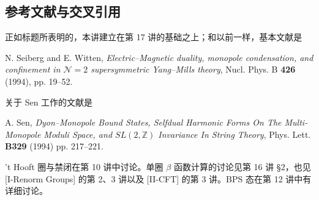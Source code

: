 
\subsection{参考文献与交叉引用}

正如标题所表明的，本讲建立在第 17 讲的基础之上；和以前一样，基本文献是

N. Seiberg and E. Witten, \emph{Electric--Magnetic duality, monopole condensation,
and confinement in $\mathcal{N}=2$ supersymmetric Yang--Mills theory},
Nucl. Phys. B \textbf{426} (1994), pp. 19--52.

关于 Sen 工作的文献是

A. Sen, \emph{Dyon--Monopole Bound States, Selfdual Harmonic Forms On The
Multi-Monopole Moduli Space, and $SL(2,\mathbb{Z})$ Invariance In String Theory},
Phys. Lett. \textbf{B329} (1994) pp. 217--221.

't Hooft 圈与禁闭在第 10 讲中讨论。单圈 $\beta$ 函数计算的讨论见第 16 讲 §2，也见 [I-Renorm Groups] 的第 2、3 讲以及 [II-CFT] 的第 3 讲。BPS 态在第 12 讲中有详细讨论。

